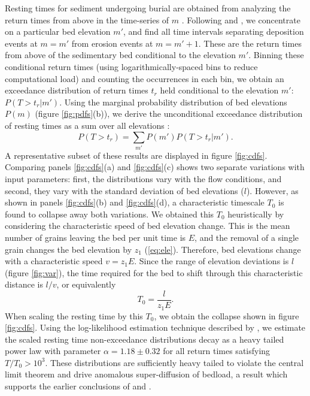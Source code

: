 Resting times for sediment undergoing burial are obtained from analyzing the return times from above in the time-series of $m$ \citep[e.g.,][]{Redner2007}.
Following \citet{Voepel2013} and \citet{Martin2014}, we concentrate on a particular bed elevation $m'$, and find all time intervals separating deposition events at $m=m'$ from erosion events at $m=m'+1$.
These are the return times from above of the sedimentary bed conditional to the elevation $m'$.
Binning these conditional return times (using logarithmically-spaced bins to reduce computational load) and counting the occurrences in each bin, we obtain an exceedance distribution of return times $t_r$ held conditional to the elevation $m'$: $P(T>t_r|m')$.
Using the marginal probability distribution of bed elevations $P(m)$ (figure \ref{fig:pdfs}(b)), we derive the unconditional exceedance distribution of resting times as a sum over all elevations \citep{Yang1971, Nakagawa1980, Voepel2013, Martin2014}: 
\begin{equation} P(T>t_r) = \sum_{m'} P(m') P(T>t_r|m') .\end{equation}
A representative subset of these results are displayed in figure \ref{fig:cdfs}.
Comparing panels \ref{fig:cdfs}(a) and \ref{fig:cdfs}(c) shows two separate variations with input parameters: first, the distributions vary with the flow conditions, and second, they vary with the standard deviation of bed elevations ($l$).
However, as shown in panels \ref{fig:cdfs}(b) and \ref{fig:cdfs}(d), a characteristic timescale $T_0$ is found to collapse away both variations.
We obtained this $T_0$ heuristically by considering the characteristic speed of bed elevation change.
This is the mean number of grains leaving the bed per unit time is $E$, and the removal of a single grain changes the bed elevation by $z_1$ (\ref{eq:ele}). 
Therefore, bed elevations change with a characteristic speed $v = z_1 E$.
Since the range of elevation deviations is $l$ (figure \ref{fig:var}), the time required for the bed to shift through this characteristic distance is $l/v$, or equivalently
\begin{equation} T_0 = \frac{l}{z_1 E}.\label{eq:time}\end{equation}
When scaling the resting time by this $T_0$, we obtain the collapse shown in figure \ref{fig:cdfs}.
Using the log-likelihood estimation technique described by \citet{Newman2005}, we estimate the scaled resting time non-exceedance distributions decay as a heavy tailed power law with parameter $\alpha = 1.18 \pm 0.32$ for all return times satisfying $T/T_0 > 10^3$.
These distributions are sufficiently heavy tailed to violate the central limit theorem and drive anomalous super-diffusion of bedload, a result which supports the earlier conclusions of \citet{Voepel2013} and \citet{Martin2014}.

